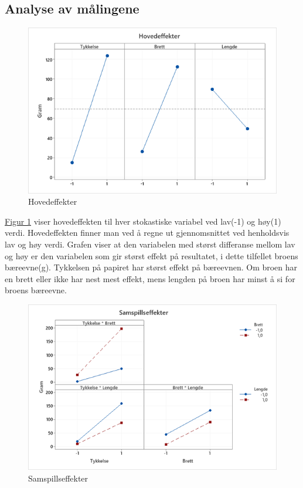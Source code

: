 \documentclass[12pt]{article}
\begin{document}
\pagebreak
\subsection{Analyse av målingene}

\begin{figure}[H]
      \includegraphics[width=\linewidth]{Figur 1.png}
      \caption{Hovedeffekter}
      \label{fig:fig1}
\end{figure}
    
\hyperref[fig:fig1]{Figur 1} viser hovedeffekten til hver stokastiske variabel ved lav(-1) og høy(1) verdi. Hovedeffekten finner man ved å regne ut gjennomsnittet ved henholdsvis lav og høy verdi. Grafen viser at den variabelen med størst differanse mellom lav og høy er den variabelen som gir størst effekt på resultatet, i dette tilfellet broens bæreevne(g).
Tykkelsen på papiret har størst effekt på bæreevnen. Om broen har en brett eller ikke har nest mest effekt, mens lengden på broen har minst å si for broens bæreevne.\cite{1}

\begin{figure}[H]
    \includegraphics[width=\linewidth]{Figur 2.png}
    \caption{Samspillseffekter}
    \label{fig:fig2}
\end{figure}
\end{document}
